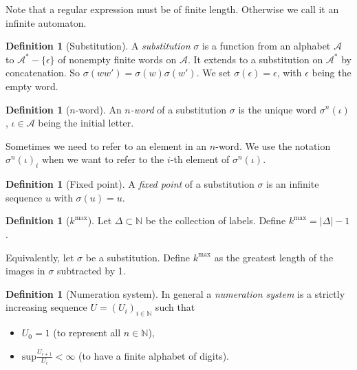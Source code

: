 \documentclass{article}
\theoremstyle{definition}
\newtheorem{definition}[theorem]{Definition}
\begin{document}
Note that a regular expression must be of finite length. Otherwise we call it
an infinite automaton.

\begin{definition}[Substitution] \label{def:substitution}
A \emph{substitution} $\sigma$ is a function from an alphabet $\mathcal{A}$ to 
$\mathcal{A}^* - \{\epsilon\}$ of nonempty finite words on $\mathcal{A}$. It
extends to a substitution on $\mathcal{A}^*$ by concatenation. So 
$\sigma(w w') = \sigma(w) \sigma(w')$. We set $\sigma(\epsilon) = \epsilon$, 
with $\epsilon$ being the empty word.
\end{definition}

\begin{definition}[$n$-word] \label{def:n-word}
An \emph{$n$-word} of a substitution $\sigma$ is the unique word 
$\sigma^n(\iota)$, $\iota \in \mathcal{A}$ being the initial letter.
\end{definition}

Sometimes we need to refer to an element in an $n$-word. We use the notation 
$\sigma^n(\iota)_i$ when we want to refer to the $i$-th element of 
$\sigma^n(\iota)$.

\begin{definition}[Fixed point] \label{def:fixed_point}
A \emph{fixed point} of a substitution $\sigma$ is an infinite sequence $u$ 
with $\sigma(u) = u$.
\end{definition}

\begin{definition}[$k^\mathrm{max}$] \label{def:k-max}
Let $\Delta \subset \mathbb{N}$ be the collection of labels. Define 
$k^\mathrm{max} = |\Delta| - 1$.

Equivalently, let $\sigma$ be a substitution. Define $k^\mathrm{max}$ as
the greatest length of the images in $\sigma$ subtracted by 1.
\end{definition}

\begin{definition}[Numeration system] \label{def:numeration_system}
In general a \emph{numeration system} is a strictly increasing sequence 
$U = (U_i)_{i \in \mathbb{N}}$ such that
\begin{itemize}
\item $U_0 = 1$ (to represent all $n \in \mathbb{N}$),
\item $\mathrm{sup}\frac{U_{i + 1}}{U_i} < \infty$ (to have a finite alphabet 
      of digits).
\end{itemize}
\end{definition}
\end{document}
